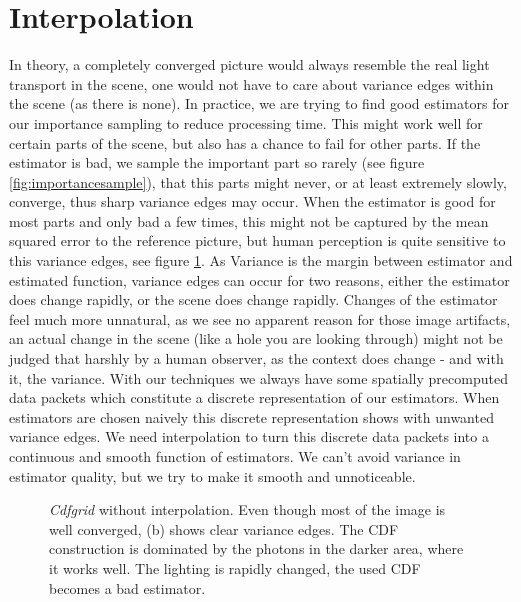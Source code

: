 \section{Interpolation}
\label{ch:interpolation}

In theory, a completely converged picture would always resemble the real light transport in the scene, one would not have to care about variance edges within the scene (as there is none). In practice, we are trying to find good estimators for our importance sampling to reduce processing time. This might work well for certain parts of the scene, but also has a chance to fail for other parts. If the estimator is bad, we sample the important part so rarely (see figure \ref{fig:importancesample}), that this parts might never, or at least extremely slowly, converge, thus sharp variance edges may occur. When the estimator is good for most parts and only bad a few times, this might not be captured by the mean squared error to the reference picture, but human perception is quite sensitive to this variance edges, see figure \ref{fig:varianceEdgeCdfgrid}. As Variance is the margin between estimator and estimated function, variance edges can occur for two reasons, either the estimator does change rapidly, or the scene does change rapidly. Changes of the estimator feel much more unnatural, as we see no apparent reason for those image artifacts, an actual change in the scene (like a hole you are looking through) might not be judged that harshly by a human observer, as the context does change - and with it, the variance. With our techniques we always have some spatially precomputed data packets which constitute a discrete representation of our estimators. When estimators are chosen naively this discrete representation shows with unwanted variance edges. We need interpolation to turn this discrete data packets into a continuous and smooth function of estimators. We can't avoid variance in estimator quality, but we try to make it smooth and unnoticeable.

\begin{figure}[htb] 
	\centering
    
    \caption{\textit{Cdfgrid} without interpolation. Even though most of the image is well converged, (b) shows clear variance edges. The CDF construction is dominated by the photons in the darker area, where it works well. The lighting is rapidly changed, the used CDF becomes a bad estimator.} 
    \label{fig:varianceEdgeCdfgrid}
\end{figure}

